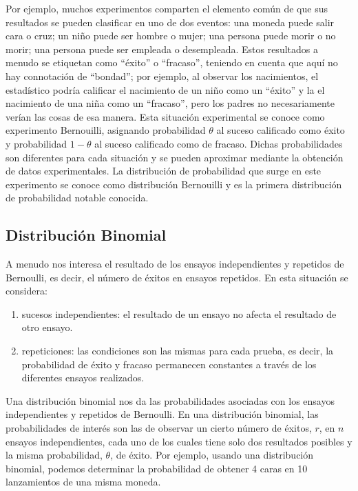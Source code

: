 \documentclass[
]{book}
\providecommand{\tightlist}{%
  \setlength{\itemsep}{0pt}\setlength{\parskip}{0pt}}
\begin{document}
Por ejemplo, muchos experimentos comparten el elemento común de que sus resultados se pueden clasificar en uno de dos eventos: una moneda puede salir cara o cruz; un niño puede ser hombre o mujer; una persona puede morir o no morir; una persona puede ser empleada o desempleada. Estos resultados a menudo se etiquetan como ``éxito'' o ``fracaso'', teniendo en cuenta que aquí no hay connotación de ``bondad''; por ejemplo, al observar los nacimientos, el estadístico podría calificar el nacimiento de un niño como un ``éxito'' y la el nacimiento de una niña como un ``fracaso'', pero los padres no necesariamente verían las cosas de esa manera. Esta situación experimental se conoce como experimento Bernouilli, asignando probabilidad \(\theta\) al suceso calificado como éxito y probabilidad \(1-\theta\) al suceso calificado como de fracaso. Dichas probabilidades son diferentes para cada situación y se pueden aproximar mediante la obtención de datos experimentales. La distribución de probabilidad que surge en este experimento se conoce como distribución Bernouilli y es la primera distribución de probabilidad notable conocida.

\hypertarget{prob-binomial}{%
\subsection{Distribución Binomial}\label{prob-binomial}}

A menudo nos interesa el resultado de los ensayos independientes y repetidos de Bernoulli, es decir, el número de éxitos en ensayos repetidos. En esta situación se considera:

\begin{enumerate}
\def\labelenumi{\arabic{enumi}.}
\tightlist
\item
  sucesos independientes: el resultado de un ensayo no afecta el resultado de otro ensayo.
\item
  repeticiones: las condiciones son las mismas para cada prueba, es decir, la probabilidad de éxito y fracaso permanecen constantes a través de los diferentes ensayos realizados.
\end{enumerate}

Una distribución binomial nos da las probabilidades asociadas con los ensayos independientes y repetidos de Bernoulli. En una distribución binomial, las probabilidades de interés son las de observar un cierto número de éxitos, \(r\), en \(n\) ensayos independientes, cada uno de los cuales tiene solo dos resultados posibles y la misma probabilidad, \(\theta\), de éxito. Por ejemplo, usando una distribución binomial, podemos determinar la probabilidad de obtener 4 caras en 10 lanzamientos de una misma moneda.
\end{document}
